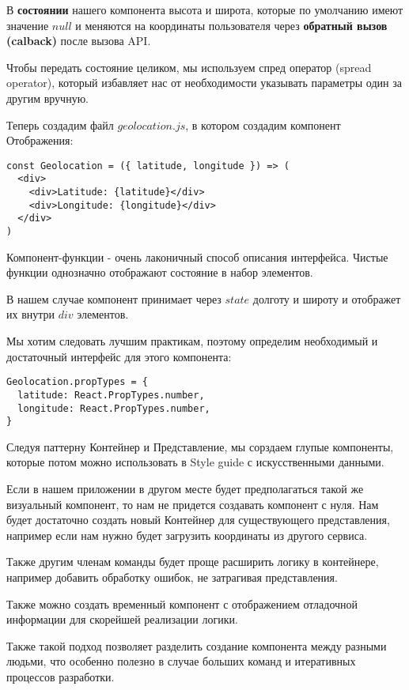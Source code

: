 В \textbf{состоянии} нашего компонента высота и широта, которые по умолчанию имеют значение $null$ и меняются на координаты пользователя через \textbf{обратный вызов (calback)} после вызова API.

Чтобы передать состояние целиком, мы используем спред оператор (spread operator), который избавляет нас от необходимости указывать параметры один за другим вручную.

Теперь создадим файл $geolocation.js$, в котором создадим компонент Отображения:

\begin{lstlisting}
const Geolocation = ({ latitude, longitude }) => (
  <div>
    <div>Latitude: {latitude}</div>
    <div>Longitude: {longitude}</div>
  </div>
)
\end{lstlisting}

Компонент-функции - очень лаконичный способ описания интерфейса. Чистые функции однозначно отображают состояние в набор элементов.

В нашем случае компонент принимает через $state$ долготу и широту и отображет их внутри $div$ элементов.

Мы хотим следовать лучшим практикам, поэтому определим необходимый и достаточный интерфейс для этого компонента:

\begin{lstlisting}
Geolocation.propTypes = {
  latitude: React.PropTypes.number,
  longitude: React.PropTypes.number,
}	
\end{lstlisting}

Следуя паттерну Контейнер и Представление, мы сорздаем глупые компоненты, которые потом можно использовать в Style guide с искусственными данными.

Если в нашем приложении в другом месте будет предполагаться такой же визуальный компонент, то нам не придется создавать компонент с нуля. Нам будет достаточно создать новый Контейнер для существующего представления, например если нам нужно будет загрузить координаты из другого сервиса.

Также другим членам команды будет проще расширить логику в контейнере, например добавить обработку ошибок, не затрагивая представления.

Также можно создать временный компонент с отображением отладочной информации для скорейшей реализации логики.

Также такой подход позволяет разделить создание компонента между разными людьми, что особенно полезно в случае больших команд и итеративных процессов разработки.

